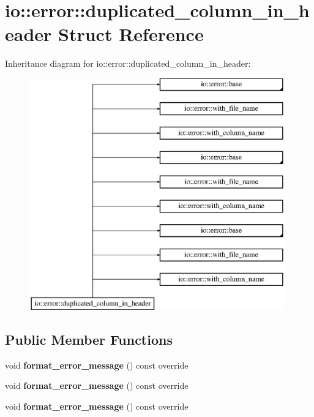 \hypertarget{structio_1_1error_1_1duplicated__column__in__header}{}\section{io\+:\+:error\+:\+:duplicated\+\_\+column\+\_\+in\+\_\+header Struct Reference}
\label{structio_1_1error_1_1duplicated__column__in__header}
Inheritance diagram for io\+:\+:error\+:\+:duplicated\+\_\+column\+\_\+in\+\_\+header\+:\begin{figure}[H]
\begin{center}
\leavevmode
\includegraphics[height=10.000000cm]{d0/d03/structio_1_1error_1_1duplicated__column__in__header}
\end{center}
\end{figure}
\subsection*{Public Member Functions}
\begin{DoxyCompactItemize}
\item 
\mbox{\label{structio_1_1error_1_1duplicated__column__in__header_ab08c387e87384836fe5bb03823298c60}} 
void {\bfseries format\+\_\+error\+\_\+message} () const override
\item 
\mbox{\label{structio_1_1error_1_1duplicated__column__in__header_ab08c387e87384836fe5bb03823298c60}} 
void {\bfseries format\+\_\+error\+\_\+message} () const override
\item 
\mbox{\label{structio_1_1error_1_1duplicated__column__in__header_ab08c387e87384836fe5bb03823298c60}} 
void {\bfseries format\+\_\+error\+\_\+message} () const override
\end{DoxyCompactItemize}
